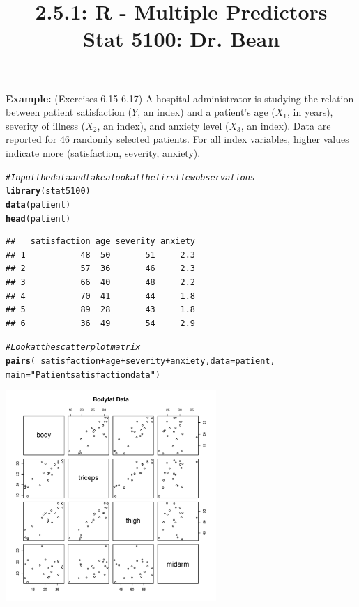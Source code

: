 \documentclass{article}\usepackage[]{graphicx}\usepackage[]{color}
\makeatletter
\newcommand{\hlstr}[1]{\textcolor[rgb]{0.192,0.494,0.8}{#1}}%
\newcommand{\hlcom}[1]{\textcolor[rgb]{0.678,0.584,0.686}{\textit{#1}}}%
\newcommand{\hlopt}[1]{\textcolor[rgb]{0,0,0}{#1}}%
\newcommand{\hlstd}[1]{\textcolor[rgb]{0.345,0.345,0.345}{#1}}%
\newcommand{\hlkwc}[1]{\textcolor[rgb]{0.333,0.667,0.333}{#1}}%
\newcommand{\hlkwd}[1]{\textcolor[rgb]{0.737,0.353,0.396}{\textbf{#1}}}%
\newenvironment{kframe}{%
 \def\at@end@of@kframe{}%
 \ifinner\ifhmode%
  \def\at@end@of@kframe{\end{minipage}}%
  \begin{minipage}{\columnwidth}%
 \fi\fi%
 \def\FrameCommand##1{\hskip\@totalleftmargin \hskip-\fboxsep
 \colorbox{shadecolor}{##1}\hskip-\fboxsep
     \hskip-\linewidth \hskip-\@totalleftmargin \hskip\columnwidth}%
 \MakeFramed {\advance\hsize-\width
   \@totalleftmargin\z@ \linewidth\hsize
   \@setminipage}}%
 {\par\unskip\endMakeFramed%
 \at@end@of@kframe}
\newenvironment{knitrout}{}{} %
\makeatother
\begin{document}
\title{%
  2.5.1: R - Multiple Predictors \\
  \smallskip
  \large Stat 5100: Dr. Bean
}
\date{}

\maketitle

\textbf{Example: } (Exercises 6.15-6.17) A hospital administrator is studying the relation between patient satisfaction ($Y$, an index) and a patient's age ($X_1$, in years), severity of illness ($X_2$, an index), and anxiety level ($X_3$, an index). Data are reported for 46 randomly selected patients. For all index variables, higher values indicate more (satisfaction, severity, anxiety).

\begin{knitrout}
\color{fgcolor}\begin{kframe}
\begin{alltt}
\hlcom{# Input the data and take a look at the first few observations}
\hlkwd{library}\hlstd{(stat5100)}
\hlkwd{data}\hlstd{(patient)}
\hlkwd{head}\hlstd{(patient)}
\end{alltt}
\begin{verbatim}
##   satisfaction age severity anxiety
## 1           48  50       51     2.3
## 2           57  36       46     2.3
## 3           66  40       48     2.2
## 4           70  41       44     1.8
## 5           89  28       43     1.8
## 6           36  49       54     2.9
\end{verbatim}
\begin{alltt}
\hlcom{# Look at the scatterplot matrix}
\hlkwd{pairs}\hlstd{(} \hlopt{~} \hlstd{satisfaction} \hlopt{+} \hlstd{age} \hlopt{+} \hlstd{severity} \hlopt{+} \hlstd{anxiety,} \hlkwc{data} \hlstd{= patient,}
       \hlkwc{main} \hlstd{=} \hlstr{"Patient satisfaction data"}\hlstd{)}
\end{alltt}
\end{kframe}

{\centering \includegraphics[width=0.6\textwidth]{figure/unnamed-chunk-1-1} 

}



\end{knitrout}
\end{document}
